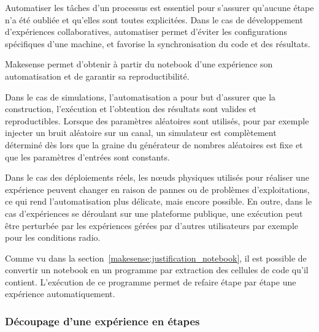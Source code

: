 Automatiser les tâches d'un processus est essentiel pour s'assurer qu'aucune étape n'a été oubliée et qu'elles sont toutes explicitées. 
Dans le cas de développement d'expériences collaboratives, automatiser permet d'éviter les configurations spécifiques d'une machine, et favorise la synchronisation du code et des résultats.

Makesense permet d'obtenir à partir du notebook d'une expérience son automatisation et de garantir sa reproductibilité.

Dans le cas de simulations, l'automatisation a pour but d'assurer que la construction, l’exécution et l'obtention des résultats sont valides et reproductibles.
Lorsque des paramètres aléatoires sont utilisés, pour par exemple injecter un bruit aléatoire sur un canal, un simulateur est complètement déterminé dès lors que la graine du générateur de nombres aléatoires est fixe et que les paramètres d'entrées sont constants.

Dans le cas des déploiements réels, les nœuds physiques utilisés pour réaliser une expérience peuvent changer en raison de pannes ou de problèmes d'exploitations, ce qui rend l'automatisation plus délicate, mais encore possible.
En outre, dans le cas d'expériences se déroulant sur une plateforme publique, une exécution peut être perturbée par les expériences gérées par d'autres utilisateurs par exemple pour les conditions radio.

Comme vu dans la section~\ref{makesense:justification_notebook}, il est possible de convertir un notebook en un programme par extraction des cellules de code qu'il contient. 
L'exécution de ce programme permet de refaire étape par étape une expérience automatiquement.

\subsubsection{Découpage d'une expérience en étapes}


